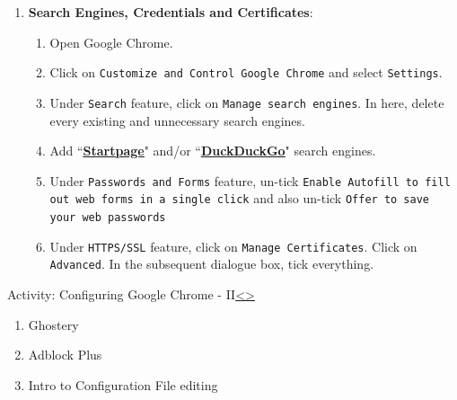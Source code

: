 \documentclass[12pt]{extarticle}
\newenvironment{instructionblock}{\Large\bgroup}{\egroup}
\begin{document}
\begin{enumerate}
	\vspace{2mm}
	\noindent
	\item	\textbf{Search Engines, Credentials and Certificates}:
	\begin{enumerate}
		\item Open Google Chrome.
		\item { Click on \texttt{Customize and Control Google Chrome} and select \texttt{Settings}.}
		\item Under \texttt{Search} feature, click on \texttt{Manage search engines}. In here, delete every existing and unnecessary search engines. 
		\item Add ``\href{https://startpage.com/eng/download-startpage-plugin.html} {\textbf{\underline{Startpage}}}" and/or ``\href{https://chrome.google.com/webstore/detail/duckduckgo-for-chrome/bpphkkgodbfncbcpgopijlfakfgmclao?hl=en} {\textbf{\underline{DuckDuckGo}}}" search engines.
		\item Under \texttt{Passwords and Forms} feature, un-tick \texttt{Enable Autofill to fill out web forms in a single click} and also un-tick \texttt{Offer to save your web passwords} 
		\item Under \texttt{HTTPS/SSL} feature, click on \texttt{Manage Certificates}. Click on \texttt{Advanced}. In the subsequent dialogue box, tick everything.
	\end{enumerate}
	\end{enumerate}
	
	


	
	
	\pagebreak
	\begin{slide}{Activity: Configuring Google Chrome - II}{\hyperref[slide 10]{\textless}\hyperref[slide 12]{\textgreater}}
		\begin{instructionblock}
			\begin{enumerate}
				\item Ghostery 
				\item Adblock Plus
				\item Intro to Configuration File editing
			\end{enumerate}
		\end{instructionblock}
	\end{slide}
	\vfill
	
\end{document}
